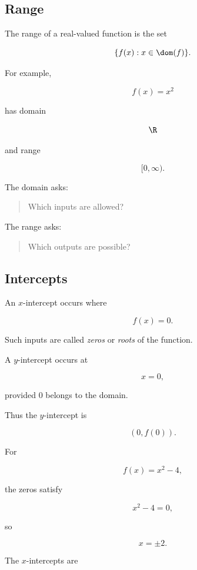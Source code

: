\subsection{Range}
\label{subsec:analysis-range}

The range of a real-valued function is the set

\[ \{f(x):x\in\dom(f)\}. \]

For example,

\[ f(x)=x^2 \]

has domain

\[ \R \]

and range

\[ [0,\infty). \]

The domain asks:

\begin{quote}
Which inputs are allowed?
\end{quote}

The range asks:

\begin{quote}
Which outputs are possible?
\end{quote}

\subsection{Intercepts}
\label{subsec:function-intercepts}

An \(x\)-intercept occurs where

\[ f(x)=0. \]

Such inputs are called \emph{zeros} or \emph{roots} of the function.

A \(y\)-intercept occurs at

\[ x=0, \]

provided \(0\) belongs to the domain.

Thus the \(y\)-intercept is

\[ (0,f(0)). \]

For

\[ f(x)=x^2-4, \]

the zeros satisfy

\[ x^2-4=0, \]

so

\[ x=\pm2. \]

The \(x\)-intercepts are


